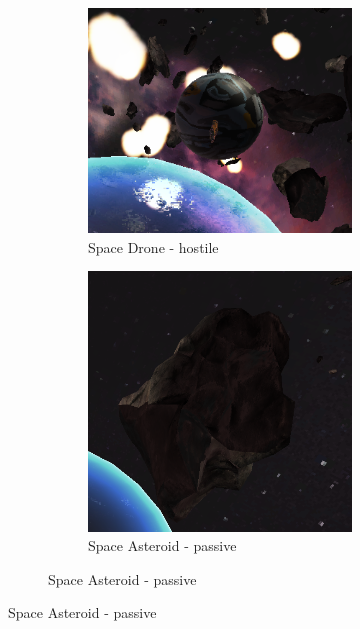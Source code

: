 \begin{figure}
\centering
\begin{subfigure}{0.49\textwidth}
\centering

\begin{subfigure}{0.49\textwidth}
\centering
\includegraphics[width = \textwidth, height=\textwidth]{images/game1}
\caption{Space Drone - hostile}
\label{fig:top}
\end{subfigure}
\begin{subfigure}{0.49\textwidth}
\centering
\includegraphics[width = \textwidth, height=\textwidth]{images/game2}
\caption{Space Asteroid - passive}
\label{fig:bottom}
\end{subfigure}


\end{subfigure}
\end{figure}
